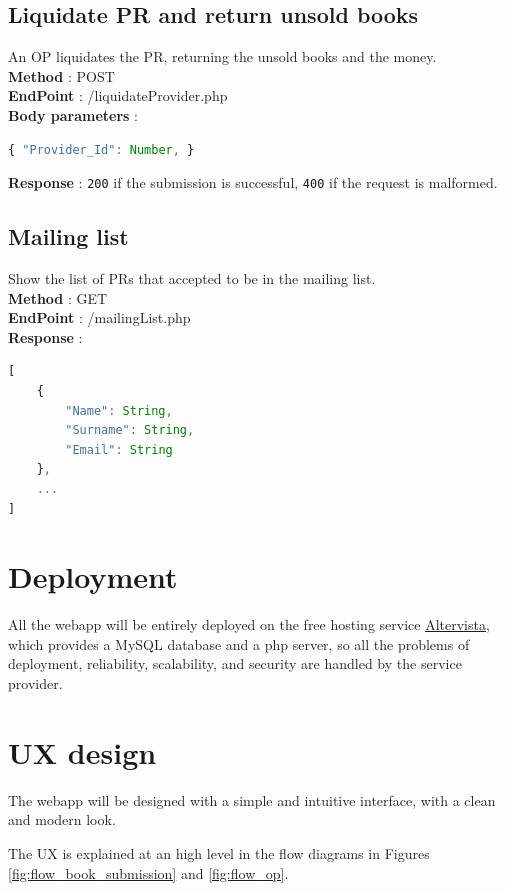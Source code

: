 \subsection{Liquidate PR and return unsold books}
An OP liquidates the PR, returning the unsold books and the money.\\
\textbf{Method} : POST \\
\textbf{EndPoint} : /liquidateProvider.php \\
\textbf{Body parameters} :
\begin{lstlisting}[language=JavaScript, label={lst:jscode}, basicstyle=\ttfamily]
{ "Provider_Id": Number, }
\end{lstlisting}
\textbf{Response} : \texttt{200} if the submission is successful, \texttt{400} if the request is malformed.

\subsection{Mailing list}
Show the list of PRs that accepted to be in the mailing list.\\
\textbf{Method} : GET \\
\textbf{EndPoint} : /mailingList.php \\
\textbf{Response} :
\begin{lstlisting}[language=JavaScript, label={lst:jscode}, basicstyle=\ttfamily]
[
    {
        "Name": String,
        "Surname": String,
        "Email": String
    },
    ...
]
\end{lstlisting}


\section{Deployment}

All the webapp will be entirely deployed on the free hosting service \href{www.altervista.org}{Altervista}, which provides a MySQL database and a php server, so all the problems of deployment, reliability, scalability, and security are handled by the service provider.

\section{UX design}

The webapp will be designed with a simple and intuitive interface, with a clean and modern look. 

The UX is explained at an high level in the flow diagrams in Figures \ref{fig:flow_book_submission} and \ref{fig:flow_op}.

